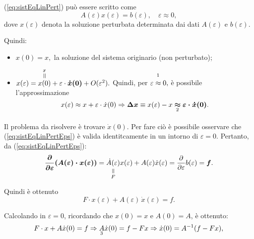 \noindent(\ref{eq:sistEqLinPert}) può essere scritto come
\begin{equation}\label{eq:sistEqLinPertEps}
    A(\varepsilon) x(\varepsilon)= b(\varepsilon),\quad \varepsilon\approx 0,
\end{equation}
dove $x(\varepsilon)$ denota la soluzione perturbata determinata dai dati $A(\varepsilon)$ e $b(\varepsilon)$.

Quindi:
\begin{itemize}
    \item $x(0)=x,$ la soluzione del sistema originario (non perturbato);
    \item $x(\varepsilon)=\equaltoup{x(0)}{x}+\varepsilon\cdot\boldsymbol{\dot x(0)}+O(\varepsilon^2).$ Quindi, per $\overset{\footnotemark}{\varepsilon\approx 0},$ è possibile l'approssimazione
    \begin{equation*}
        x(\varepsilon)\approx x+\varepsilon\cdot\dot x(0)\Rightarrow\boldsymbol{\Delta x}\equiv x(\varepsilon)-x\underset{\footnotemark}{\boldsymbol\approx}\boldsymbol{\varepsilon\cdot\dot x(0)}.
    \end{equation*}

\end{itemize}

\addtocounter{footnote}{-1}


Il problema da risolvere è trovare $\dot x(0)$. Per fare ciò è possibile osservare che (\ref{eq:sistEqLinPertEps}) è valida identitcamente in un intorno di $\varepsilon=0.$ Pertanto, da (\ref{eq:sistEqLinPertEps}):
\begin{equation*}
   \boldsymbol{\frac{\partial}{\partial\varepsilon}(A(\varepsilon)\cdot x(\varepsilon))}=\equalto{\dot A(\varepsilon)}{F}x(\varepsilon) + A(\varepsilon)\dot x(\varepsilon)=\frac{\partial}{\partial\varepsilon} b(\varepsilon)=\boldsymbol f.
\end{equation*}

Quindi è ottenuto
\begin{equation*}
 F\cdot x(\varepsilon) + A(\varepsilon)\,\dot x(\varepsilon)=f.
\end{equation*}


Calcolando in $\varepsilon=0$, ricordando che $x(0)=x$ e $A(0)=A$, è ottenuto: 
\begin{equation*}
    F\cdot x + A \dot x(0) = f \Rightarrow \underset{\footnotemark}{A} \dot x(0) = f - Fx\Rightarrow \dot x(0) = A^{-1}(f - Fx),
\end{equation*}

